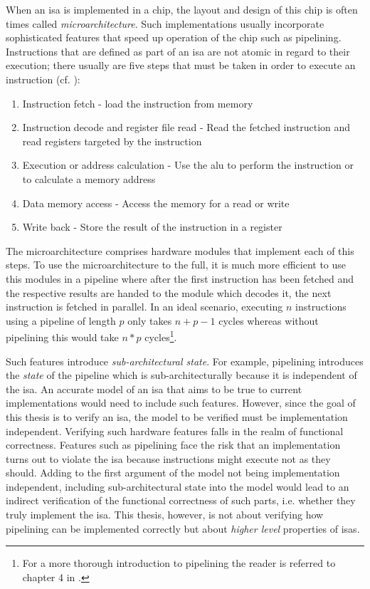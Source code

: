 When an \gls{isa} is implemented in a chip, the layout and design of this chip is often times called \textit{microarchitecture}.
Such implementations usually incorporate sophisticated features that speed up operation of the chip such as pipelining.
Instructions that are defined as part of an \gls{isa} are not atomic in regard to their execution; there usually are five steps that must be taken in order to execute an instruction (cf. \cite[p.286]{Patterson13}):
\begin{enumerate}
    \item Instruction fetch - load the instruction from memory
    \item Instruction decode and register file read - Read the fetched instruction and read registers targeted by the instruction
    \item Execution or address calculation - Use the \gls{alu} to perform the instruction or to calculate a memory address
    \item Data memory access - Access the memory for a read or write
    \item Write back - Store the result of the instruction in a register
\end{enumerate}
The microarchitecture comprises hardware modules that implement each of this steps.
To use the microarchitecture to the full, it is much more efficient to use this modules in a pipeline where after the first instruction has been fetched and the respective results are handed to the module which decodes it, the next instruction is fetched in parallel.
In an ideal scenario, executing $ n $ instructions using a pipeline of length $ p $ only takes $ n + p - 1 $ cycles whereas without pipelining this would take $ n * p $ cycles\footnote{%
    For a more thorough introduction to pipelining the reader is referred to chapter 4 in \cite{Patterson13}.
}.

Such features introduce \textit{sub-architectural state}.
For example, pipelining introduces the \textit{state} of the pipeline which is sub-architecturally because it is independent of the \gls{isa}.
An accurate model of an \gls{isa} that aims to be true to current implementations would need to include such features.
However, since the goal of this thesis is to verify an \gls{isa}, the model to be verified must be implementation independent.
Verifying such hardware features falls in the realm of functional correctness.
Features such as pipelining face the risk that an implementation turns out to violate the \gls{isa} because instructions might execute not as they should.
Adding to the first argument of the model not being implementation independent, including sub-architectural state into the model would lead to an indirect verification of the functional correctness of such parts, i.e. whether they truly implement the \gls{isa}.
This thesis, however, is not about verifying how pipelining can be implemented correctly but about \textit{higher level} properties of \glspl{isa}.

